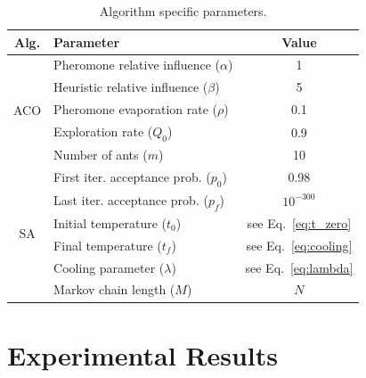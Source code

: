 \documentclass[onecolumn]{elsarticle}
\begin{document}
\begin{table}[t]
\centering
\caption{Algorithm specific parameters.}
\label{tab:parameters}
\begin{tabular}{c l c}
\hline
Alg.                    &           Parameter                                            &       Value \\ \hline
\multirow{5}{*}{ACO}    &           Pheromone relative influence ($\alpha$)              &         1 \\
                        &           Heuristic relative influence ($\beta$)               &         5 \\
                        &           Pheromone evaporation rate ($\rho$)                  &       0.1 \\
                        &           Exploration rate ($Q_0$)                             &       0.9 \\ 
                        &           Number of ants ($m$)                                 & 10 \\ \hline
\multirow{6}{*}{SA}     &           First iter. acceptance prob. ($p_0$)                 & 0.98  \\ 
                        &           Last iter. acceptance prob. ($p_f$)                  & $10^{-300}$  \\
                        &           Initial temperature ($t_0$)                          & see Eq.~\ref{eq:t_zero} \\
                        &           Final temperature ($t_f$)                            & see Eq.~\ref{eq:cooling}  \\
                        &           Cooling parameter ($\lambda$)                        & see Eq.~\ref{eq:lambda} \\
                        &           Markov chain length ($M$)                            & $N$ \\ \hline
                         
\end{tabular}
\end{table}
\section{Experimental Results}
\label{sec:results}
\end{document}
